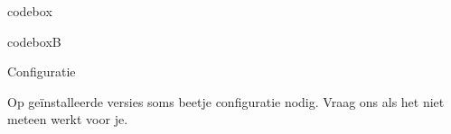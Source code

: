 

\begin{saveblock}{codebox}
	\begin{highlightblock}
		\usepackage[backend=biber]{biblatex}
	\end{highlightblock}
\end{saveblock}

\begin{saveblock}{codeboxB}
	\begin{highlightblock}
	\end{highlightblock}
\end{saveblock}

\begin{frame}{Configuratie}

	\bigskip

	Op ge\"installeerde versies soms beetje configuratie nodig.
	Vraag ons als het niet meteen werkt voor je.
	

\end{frame}

	



	
		
			
